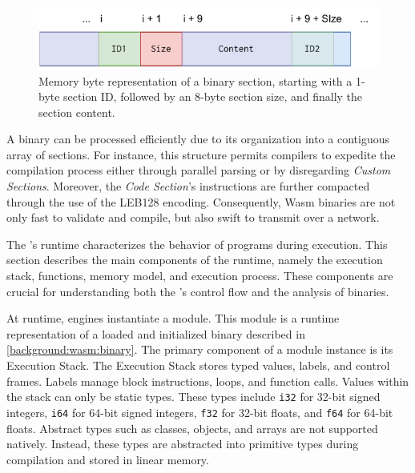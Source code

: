 \begin{figure}[h]
    \centering
    \includegraphics[width=0.5\linewidth]{figures/section.pdf}
    \caption{Memory byte representation of a \Wasm binary section, starting with a 1-byte section ID, followed by an 8-byte section size, and finally the section content.}
    \label{background:wasm:fig:section}
\end{figure}

A \wasm binary can be processed efficiently due to its organization into a contiguous array of sections. 
For instance, this structure permits compilers to expedite the compilation process either through parallel parsing or by disregarding \emph{Custom Sections}. 
Moreover, the \emph{Code Section}'s instructions are further compacted through the use of the LEB128 encoding. 
Consequently, Wasm binaries are not only fast to validate and compile, but also swift to transmit over a network.

\label{background:wasm:execution}

The \Wasm's runtime characterizes the behavior of \wasm programs during execution. 
This section describes the main components of the \Wasm runtime, namely the execution stack, functions, memory model, and execution process. 
These components are crucial for understanding both the \Wasm's control flow and the analysis of \Wasm binaries.


 At runtime, \Wasm engines instantiate a \Wasm module. 
This module is a runtime representation of a loaded and initialized \Wasm binary described in \autoref{background:wasm:binary}. 
The primary component of a module instance is its Execution Stack. 
The Execution Stack stores typed values, labels, and control frames. 
Labels manage block instructions, loops, and function calls. 
Values within the stack can only be static types.
These types include \texttt{i32} for 32-bit signed integers, \texttt{i64} for 64-bit signed integers, \texttt{f32} for 32-bit floats, and \texttt{f64} for 64-bit floats. 
Abstract types such as classes, objects, and arrays are not supported natively. 
Instead, these types are abstracted into primitive types during compilation and stored in linear memory.


